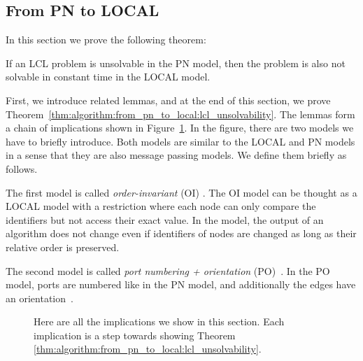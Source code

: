 \newpage
\subsection{From PN to LOCAL} \label{sec:algorithm:from_pn_to_local}

In this section we prove the following theorem:
\begin{theorem} \label{thm:algorithm:from_pn_to_local:lcl_unsolvability}
    If an LCL problem is unsolvable in the PN model, then the problem is also not solvable in constant time in the LOCAL model.
\end{theorem}

First, we introduce related lemmas, and at the end of this section, we prove Theorem~\ref{thm:algorithm:from_pn_to_local:lcl_unsolvability}.
The lemmas form a chain of implications shown in Figure~\ref{fig:proof_order:lcl_unsolvability}.
In the figure, there are two models we have to briefly introduce.
Both models are similar to the LOCAL and PN models in a sense that they are also message passing models.
We define them briefly as follows.

The first model is called \emph{order-invariant} (OI) \cite{DBLP:journals/siamcomp/NaorS95}.
The OI model can be thought as a LOCAL model with a restriction where each node can only compare the identifiers but not access their exact value.
In the model, the output of an algorithm does not change even if identifiers of nodes are changed as long as their relative order is preserved.

The second model is called \emph{port numbering + orientation} (PO)~\cite{DBLP:conf/istcs/MayerNS95}.
In the PO model, ports are numbered like in the PN model, and additionally the edges have an orientation~\cite{DBLP:journals/dc/GoosHS17}.


\begin{figure}[H]
   \centering
    \caption{Here are all the implications we show in this section.
    Each implication is a step towards showing Theorem \ref{thm:algorithm:from_pn_to_local:lcl_unsolvability}.
    }
   \label{fig:proof_order:lcl_unsolvability}
\end{figure}

